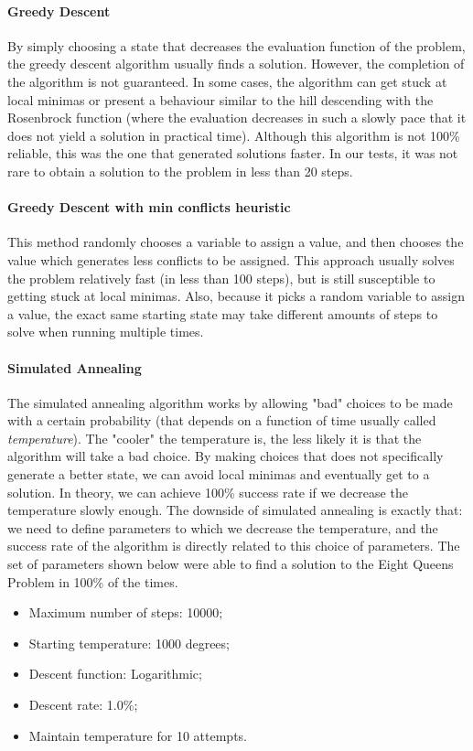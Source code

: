 \documentclass{article}
\begin{document}
\paragraph{Greedy Descent} By simply choosing a state that decreases the evaluation function of the problem, the greedy descent algorithm usually finds a solution. However, the completion of the algorithm is not guaranteed. In some cases, the algorithm can get stuck at local minimas or present a behaviour similar to the hill descending with the Rosenbrock function (where the evaluation decreases in such a slowly pace that it does not yield a solution in practical time). Although this algorithm is not 100\% reliable, this was the one that generated solutions faster. In our tests, it was not rare to obtain a solution to the problem in less than 20 steps.

\paragraph{Greedy Descent with min conflicts heuristic} This method randomly chooses a variable to assign a value, and then chooses the value which generates less conflicts to be assigned. This approach usually solves the problem relatively fast (in less than 100 steps), but is still susceptible to getting stuck at local minimas. Also, because it picks a random variable to assign a value, the exact same starting state may take different amounts of steps to solve when running multiple times.

\paragraph{Simulated Annealing} The simulated annealing algorithm works by allowing "bad" choices to be made with a certain probability (that depends on a function of time usually called \textit{temperature}). The "cooler" the temperature is, the less likely it is that the algorithm will take a bad choice. By making choices that does not specifically generate a better state, we can avoid local minimas and eventually get to a solution. In theory, we can achieve 100\% success rate if we decrease the temperature slowly enough. The downside of simulated annealing is exactly that: we need to define parameters to which we decrease the temperature, and the success rate of the algorithm is directly related to this choice of parameters. The set of parameters shown below were able to find a solution to the Eight Queens Problem in 100\% of the times.
\begin{itemize}
\item Maximum number of steps: 10000;
\item Starting temperature: 1000 degrees;
\item Descent function: Logarithmic;
\item Descent rate: 1.0\%;
\item Maintain temperature for 10 attempts.
\end{itemize}
\end{document}
